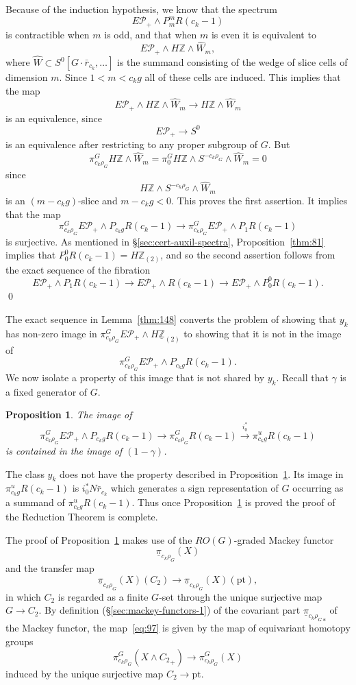 \documentclass{amsart}
\newtheorem{prop}[equation]{Proposition}
\theoremstyle{definition}
\theoremstyle{remark}
\newenvironment{pf}{\bigskip{\em Proof:\/}}{\qed\medskip}
\newcommand{\Z}{{\mathbb Z}}
\newcommand{\slc}[2]{P_{#1}^{#1}#2}
\newcommand{\norm}{N}
\newcommand{\piu}{\pi^{u}}
\newcommand{\pim}{\underline{\pi}}
\newcommand{\epfam}{E\pfamily_{+}}
\newcommand{\zlt}{\Z_{(2)}}
\newcommand{\zltm}{\underline{\Z}_{(2)}}
\newcommand{\gbar}{\bar}
\newcommand{\rr}{\gbar{r}}
\newcommand{\zt}{C_{2}}
\newcommand{\refine}{\widehat{W}}
\newcommand{\ckp}{c_{k}}
\newcommand{\ck}{c_{k}}
\newcommand{\pfamily}{\mathcal P}
\begin{document}
\begin{pf}
Because of the induction hypothesis, we know that the spectrum 
\[
\epfam\wedge \slc{m}{R(\ck-1)}
\]
is contractible when $m$ is odd, and that when $m$ is even it is
equivalent to
\[
\epfam\wedge H\Z\wedge \refine_{m},
\]
where $\refine\subset S^{0}[G\cdot\rr_{\ck},\dots]$ is the summand
consisting of the wedge of slice cells of dimension $m$.  Since
$1<m<\ck g$ all of these cells are induced.  This implies that the map
\[
\epfam\wedge H\Z\wedge \refine_{m}\to H\Z\wedge \refine_{m}
\]
is an equivalence, since 
\[
\epfam\to S^{0}
\]
is an equivalence after restricting to any proper subgroup of $G$.
But 
\[
\pi^{G}_{\ck\rho_{G}} H\Z\wedge \refine_{m} = \pi^{G}_{0}H\Z\wedge
S^{-\ck\rho_{G}}\wedge\refine_{m}=0
\]
since 
\[
H\Z\wedge S^{-\ck\rho_{G}}\wedge\refine_{m}
\]
is an $(m-\ck g)$-slice and $m-\ck g<0$.  This proves the first
assertion.  It implies that the map
\[
\pi^{G}_{\ckp\rho_{G}}\epfam\wedge P_{\ckp g}R(\ck-1) \to
\pi^{G}_{\ckp\rho_{G}}\epfam\wedge P_{1}R(\ck-1) 
\]
is surjective.  As mentioned in \S\ref{sec:cert-auxil-spectra},
Proposition~\ref{thm:81} implies that $\slc{0}{R(\ck-1)}=H\zlt$, and
so the second assertion follows from the exact sequence of the
fibration
\[
\epfam\wedge P_{1}R(\ck-1) \to \epfam\wedge R(\ck-1)\to \epfam\wedge \slc{0}{R(\ck-1)}.
\]
\end{pf}

The exact sequence in Lemma~\ref{thm:148} converts the problem of
showing that $y_{k}$ has non-zero image in
$\pi^{G}_{\ckp\rho_{G}}\epfam\wedge H\zltm$ to showing that it is not in
the image of
\[
\pi^{G}_{\ckp\rho_{G}}\epfam\wedge P_{\ckp g}R(\ck-1).
\]
We now isolate a property of this image 
that is not shared by $y_{k}$.  Recall that $\gamma$ is a fixed
generator of $G$.
\begin{prop}
\label{thm:165}
The image of
\[
\pi^{G}_{\ckp\rho_{G}}\epfam\wedge P_{\ckp g} R(\ck-1) \to
\pi^{G}_{\ckp\rho_{G}}
R(\ck-1)
\xrightarrow{i_{0}^{\ast}} \piu_{\ckp g}
R(\ck-1)
\]
is contained in the image of $(1-\gamma)$.
\end{prop}

The class $y_{k}$ does not have the property described in
Proposition~\ref{thm:165}.  Its image in $\piu_{\ckp g}R(\ck-1)$ is
$i_{0}^{\ast}\norm\rr_{\ck}$ which generates a sign representation of
$G$ occurring as a summand of $\piu_{\ckp g}R(\ck-1)$.  Thus once
Proposition~\ref{thm:165} is proved the proof of the Reduction Theorem
is complete.

The proof of Proposition~\ref{thm:165} makes use of the $RO(G)$-graded
Mackey functor 
\[
\pim_{\ckp\rho_{G}}(X)
\]
and the transfer map 
\begin{equation}
\label{eq:97}
\pim_{\ckp\rho_{G}}(X)(\zt)\to 
\pim_{\ckp\rho_{G}}(X)(\text{pt}),
\end{equation}
in which $\zt$ is regarded as a finite $G$-set through the unique
surjective map $G\to\zt$.  By definition
(\S\ref{sec:mackey-functors-1}) of the covariant part
${\pim_{\ck\rho_{G}}}_{\ast}$ of the Mackey functor, the
map~\eqref{eq:97} is given by the map of equivariant homotopy groups
\[
\pi^{G}_{\ckp\rho_{G}}(X\wedge {\zt}_{+}) \to 
\pi^{G}_{\ckp\rho_{G}} (X)
\]
induced by the unique surjective map $\zt\to\text{pt}$.
\end{document}
